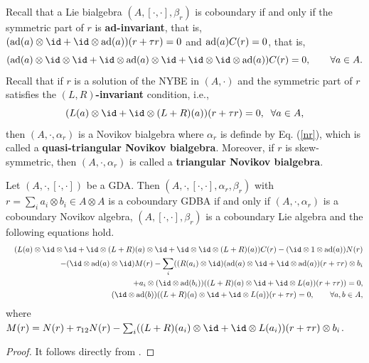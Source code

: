 \documentclass[12pt]{amsart}
\begin{document}
Recall that a  Lie bialgebra $(A,[\cdot,\cdot],\beta_r)$ is
coboundary if and only if  the symmetric part of $r$ is {\bf
ad-invariant}, that is, $({\rm ad}(a)\otimes \id+\id\otimes {\rm
ad}(a))(r+\tau r)=0$ %
 and ${\rm ad}(a)C(r)=0$, that is,
\begin{equation*}
    ({\rm ad}(a)\otimes \id\otimes \id+\id\otimes {\rm ad}(a)\otimes \id+\id\otimes \id\otimes {\rm ad}(a) )C(r)=0,\qquad \forall a\in A.
\end{equation*}
Recall \cite{CH} that
 if  $r$ is a solution of the NYBE in $(A,\cdot)$ and the
symmetric part of $r$  satisfies the {\bf $(L,R)$-invariant}
condition, i.e.,  $$(L(a)\otimes \id+\id\otimes (L+R)(a))(r+\tau
r)=0,\;\; \forall a\in A,$$ then  $(A, \cdot, \alpha_r)$ is a
Novikov bialgebra where $\alpha_r$ is definde by Eq. (\ref{nr}),
which is called a {\bf quasi-triangular Novikov bialgebra}.
Moreover, if $r$ is skew-symmetric, then $ (A,\cdot,\alpha_r)$ is
called a {\bf triangular Novikov bialgebra}.



\begin{proposition}  \label{gdcob}
    Let $(A,\cdot,[\cdot,\cdot])$ be a GDA. Then $(A,\cdot,[\cdot,\cdot],\alpha_r,\beta_r)$ with $r=\sum_i a_i\otimes b_i\in A\otimes A$ is a coboundary GDBA
    if and only if $(A,\cdot,\alpha_r)$ is a coboundary Novikov algebra, $(A,[\cdot,\cdot],\beta_r)$ is a coboundary Lie algebra and the following equations
    hold.
    \begin{eqnarray*}
        &&(L(a)\otimes \id\otimes \id +\id\otimes(L+R)(a)\otimes\id+\id\otimes\id\otimes(L+R)(a))C(r)-(\id\otimes1\otimes {\rm ad}(a))N(r)\\
        &&\qquad -(\id\otimes {\rm ad}(a)\otimes \id)M(r) - \sum_i( (R(a_i)\otimes \id)({\rm ad}(a)\otimes \id+\id\otimes {\rm ad}(a))(r+\tau r)\otimes b_i   \\
        &&\qquad+ a_i\otimes(\id\otimes {\rm ad}(b_i))((L+R)(a)\otimes\id+\id\otimes L(a)  )(r+\tau r))=0,  \\
        &&(\id\otimes {\rm ad}(b))( (L+R)(a)\otimes\id +\id\otimes L(a))(r+\tau r)=0, \qquad \forall a,b\in A,
    \end{eqnarray*}
where
    $M(r)=N(r)+\tau_{12}N(r)- \sum_i( (L+R)(a_i)\otimes\id+\id\otimes L(a_i)  )(r+\tau r)\otimes b_i$.


\end{proposition}
\begin{proof}
   It  follows directly from \cite[Theorem 3.3]{HBG}.
\end{proof}
\end{document}
